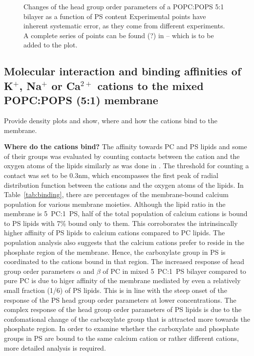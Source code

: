 \documentclass[journal=jpcbfk,manuscript=article]{achemso}
\begin{document}
\begin{figure}[htb!]
  \caption{\label{fig:delta_ordPar_NaCl_PC-PS_mix} 
    Changes of the head group order parameters of a POPC:POPS 5:1 bilayer as a function of PS content
    Experimental points have inherent systematic error, as they come from different experiments.
    A complete series of points can be found (?) in \cite{roux90} -- which is to be added to the plot.
  } 
\end{figure} 



 
 
 


\subsection{Molecular interaction and binding affinities of K$^+$, Na$^+$ or Ca$^{2+}$  cations to the mixed POPC:POPS (5:1) membrane} 
\label{sec:affinity} 

Provide density plots and show, where and how the cations bind to the membrane. 

\textbf{Where do the cations bind?} 
The affinity towards PC and PS lipids and some of their groups was evaluated 
by counting contacts between the cation and the oxygen atoms of the lipids
similarly as was done in \cite{melcr18}. 
The threshold for counting a contact was set to be $0.3 \mathrm{nm}$, 
which encompasses the first peak of radial distribution function between the cations and the oxygen atoms of the lipids. 
In Table~\ref{tab:binding}, there are percentages of the membrane-bound calcium population for various membrane moieties. 
Although the lipid ratio in the membrane is 5~PC:1~PS,
half of the total population of calcium cations is bound to PS lipids
with 7\% bound only to them. 
This corroborates the intrinsincally higher affinity of PS lipids to calcium cations compared to PC lipids. 
The population analysis also suggests 
that the calcium cations prefer to reside in the phosphate region of the membrane. 
Hence, the carboxylate group in PS is coordinated to the cations bound in that region. 
The increased response of head group order parameters $\alpha$ and $\beta$ of PC 
in mixed 5~PC:1~PS bilayer compared to pure PC
is due to higer affinity of the membrane mediated by even a relatively small fraction (1/6) of PS lipids. 
This is in line with the steep onset of the response of the PS head group order parameters at lower concentrations.
The complex response of the head group order parameters of PS lipids 
is due to the confomational change of the carboxylate group that is attracted more towards the phosphate region. 
In order to examine whether the carboxylate and phosphate groups in PS are bound 
to the same calcium cation or rather different cations, 
more detailed analysis is required. 
\end{document}
